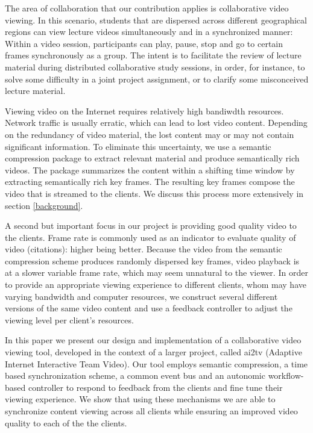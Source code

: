 \documentclass{sig-alternate}
\begin{document}
The area of collaboration that our contribution applies is
collaborative video viewing.  In this scenario, students that are
dispersed across different geographical regions can view lecture
videos simultaneously and in a synchronized manner: Within a video
session, participants can play, pause, stop and go to certain frames
synchronously as a group.  The intent is to facilitate the review of
lecture material during distributed collaborative study sessions, in
order, for instance, to solve some difficulty in a joint project
assignment, or to clarify some misconceived lecture material.

Viewing video on the Internet requires relatively high bandiwdth
resources.  Network traffic is usually erratic, which can lead to lost
video content. Depending on the redundancy of video material, the lost
content may or may not contain significant information.  To eliminate
this uncertainty, we use a semantic compression package
\cite{TIECHENG} to extract relevant material and produce semantically
rich videos.  The package summarizes the content within a shifting
time window by extracting semantically rich key frames.  The resulting
key frames compose the video that is streamed to the clients.  We
discuss this process more extensively in section \ref{background}.

A second but important focus in our project is providing good quality
video to the clients.  Frame rate is commonly used as an indicator to
evaluate quality of video (citations): higher being better.  Because
the video from the semantic compression scheme produces randomly
dispersed key frames, video playback is at a slower variable frame
rate, which may seem unnatural to the viewer.  In order to provide an
appropriate viewing experience to different clients, whom may have
varying bandwidth and computer resources, we construct several
different versions of the same video content and use a feedback
controller to adjust the viewing level per client's resources.

In this paper we present our design and implementation of a
collaborative video viewing tool, developed in the context of a larger
project, called ai2tv (Adaptive Internet Interactive Team
Video).  Our tool employs semantic compression, a time based
synchronization scheme, a common event bus and an autonomic
workflow-based controller to respond to feedback from the clients and
fine tune their viewing experience.  We show that using these
mechanisms we are able to synchronize content viewing across all
clients while ensuring an improved video quality to each of the the
clients.
\end{document}
